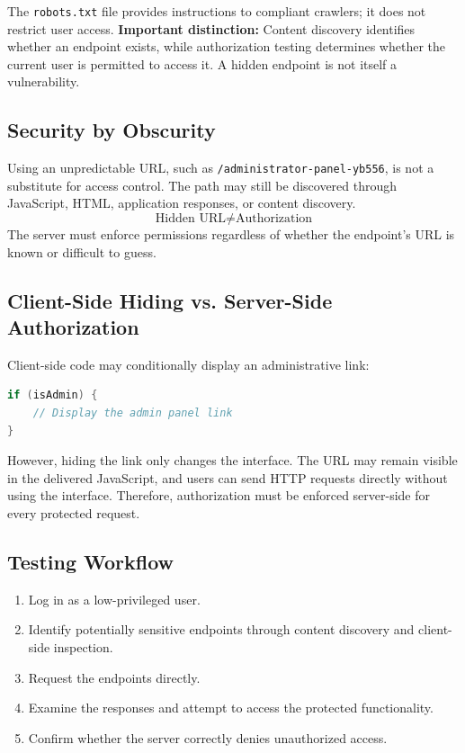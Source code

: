 \documentclass[11pt,a4paper]{article}
\begin{document}
The \texttt{robots.txt} file provides instructions to compliant crawlers; it does not restrict user access.
\textbf{Important distinction:} Content discovery identifies whether an endpoint exists, while authorization testing determines whether the current user is permitted to access it. A hidden endpoint is not itself a vulnerability.

\subsection{Security by Obscurity}

Using an unpredictable URL, such as \texttt{/administrator-panel-yb556}, is not a substitute for access control. The path may still be discovered through JavaScript, HTML, application responses, or content discovery.
\[
    \text{Hidden URL} \neq \text{Authorization}
\]
The server must enforce permissions regardless of whether the endpoint's URL is known or difficult to guess.

\subsection{Client-Side Hiding vs. Server-Side Authorization}

Client-side code may conditionally display an administrative link:
\begin{lstlisting}[language=Java]
if (isAdmin) {
    // Display the admin panel link
}
\end{lstlisting}

However, hiding the link only changes the interface. The URL may remain visible in the delivered JavaScript, and users can send HTTP requests directly without using the interface.
Therefore, authorization must be enforced server-side for every protected request.

\subsection{Testing Workflow}

\begin{enumerate}
    \item Log in as a low-privileged user.
    \item Identify potentially sensitive endpoints through content discovery and client-side inspection.
    \item Request the endpoints directly.
    \item Examine the responses and attempt to access the protected functionality.
    \item Confirm whether the server correctly denies unauthorized access.
\end{enumerate}
\end{document}
